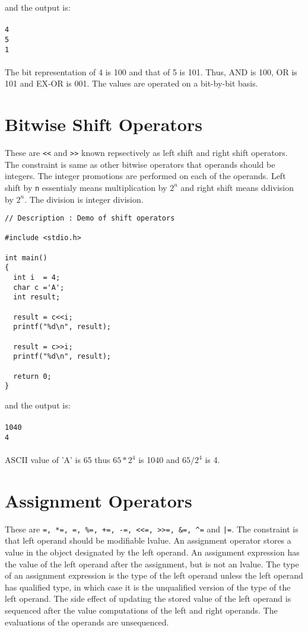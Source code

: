 and the output is:
\\\\\texttt{4\\
5\\
1\\\\}
The bit representation of 4 is 100 and that of 5 is 101. Thus, AND is 100, OR
is 101 and EX-OR is 001. The values are operated on a bit-by-bit basis.

\section{Bitwise Shift Operators}
These are \texttt{\textless\textless} and \texttt{\textgreater\textgreater}
known repsectively as left shift and right shift operators.
The constraint is same as other bitwise operators that operands should be
integers. The integer promotions are performed on each of the operands. Left
shift by \texttt{n} essentialy means multiplication by $2^n$ and right shift
means ddivision by $2^n$. The division is integer division.

\begin{verbatim}
// Description : Demo of shift operators

#include <stdio.h>

int main()
{
  int i  = 4;
  char c ='A';
  int result;

  result = c<<i;
  printf("%d\n", result);

  result = c>>i;
  printf("%d\n", result);

  return 0;
}
\end{verbatim}

and the output is:
\\\\\texttt{1040\\
4\\\\}
ASCII value of 'A' is 65 thus $65*2^4$ is 1040 and $65/2^4$ is 4.

\section{Assignment Operators}
These are \texttt{=, *=, \/=, \%=, +=, -=, \textless\textless =,
  \textgreater\textgreater =, \&=,
  \textasciicircum=} and \texttt{|=}. The constraint is that left operand
should be modifiable lvalue. An assignment operator stores a value in the
object designated by the left operand. An assignment expression has the value
of the left operand after the assignment, but is not an lvalue. The type of an
assignment expression is the type of the left operand unless the left operand
has qualified type, in which case it is the unqualified version of the type of
the left operand. The side effect of updating the stored value of the left
operand is sequenced after the value computations of the left and right
operands. The evaluations of the operands are unsequenced.

